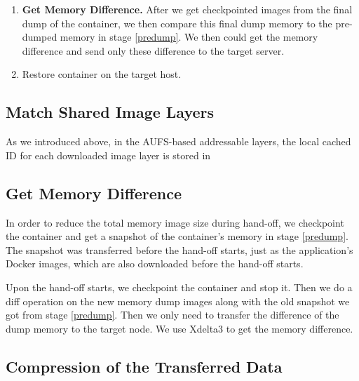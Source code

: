 \begin{enumerate}[label=\textbf{S\arabic*}]
\item \label{img-sync} \textbf{Get Memory Difference.} After we get checkpointed images from the final dump of the container, we then compare this final dump memory to the pre-dumped memory in stage \ref{predump}. We then could get the memory difference and send only these difference to the target server. 

\item \label{restore} Restore container on the target host.

\end{enumerate}


 
\subsection{Match Shared Image Layers}

As we introduced above, in the AUFS-based addressable layers, the local cached ID for each downloaded image layer is stored in 

\subsection{Get Memory Difference}
In order to reduce the total memory image size during hand-off, we checkpoint the container and get a snapshot of the container's memory in stage \ref{predump}. The snapshot was transferred before the hand-off starts, just as the application's Docker images, which are also downloaded before the hand-off starts.

Upon the hand-off starts, we checkpoint the container and stop it. Then we do a diff operation on the new memory dump images along with the old snapshot we got from stage \ref{predump}. Then we only need to transfer the difference of the dump memory to the target node. We use Xdelta3 to get the memory difference.



\subsection{Compression of the Transferred Data}

